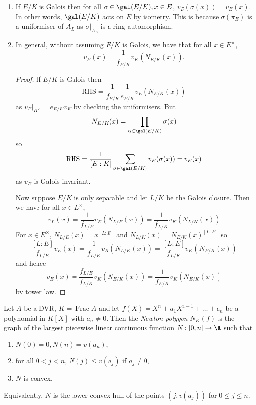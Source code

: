 \documentclass[a4paper]{article}
\DeclareMathOperator{\Frac}{Frac}
\begin{document}
\begin{remark}\leavevmode
  \begin{enumerate}
  \item If \(E/K\) is Galois then for all \(\sigma \in \gal(E/K), x \in E\), \(v_E(\sigma(x)) = v_E(x)\). In other words, \(\gal(E/K)\) acts on \(E\) by isometry. This is because \(\sigma(\pi_E)\) is a uniformiser of \(A_E\) as \(\sigma|_{A_E}\) is a ring automorphism.
  \item In general, without assuming \(E/K\) is Galois, we have that for all \(x \in E^\times\),
    \[
      v_E(x) = \frac{1}{f_{E/K}} v_K(N_{E/K}(x)).
    \]

    \begin{proof}
      If \(E/K\) is Galois then
      \[
        \mathrm{RHS } = \frac{1}{f_{E/K}} \frac{1}{e_{E/K}} v_E(N_{E/K}(x))
      \]
      as \(v_E|_{K^\times} = e_{E/K} v_K\) by checking the uniformisers. But
      \[
        N_{E/K}(x) = \prod_{\alpha \in \gal(E/K)} \sigma(x)
      \]
      so
      \[
        \mathrm{RHS} = \frac{1}{[E : K]} \sum_{\sigma \in \gal(E/K)} v_E(\sigma(x)) = v_E(x)
      \]
      as \(v_E\) is Galois invariant.

      Now suppose \(E/K\) is only separable and let \(L/K\) be the Galois closure. Then we have for all \(x \in L^\times\),
      \[
        v_L(x) = \frac{1}{f_{L/E}} v_E(N_{L/E}(x)) = \frac{1}{f_{L/K}} v_K(N_{L/K}(x))
      \]
      For \(x \in E^\times\), \(N_{L/E}(x) = x^{[L: E]}\) and \(N_{L/K}(x) = N_{E/K}(x)^{[L :E]}\) so
      \[
        \frac{[L: E]}{f_{L/E}} v_E(x) = \frac{1}{f_{L/K}} v_K(N_{L/K}(x)) = \frac{[L : E]}{f_{L/K}} v_K(N_{E/K}(x))
      \]
      and hence
      \[
        v_E(x) = \frac{f_{L/E}}{f_{L/K}} v_K(N_{E/K}(x)) = \frac{1}{f_{E/K}} v_K(N_{E/K}(x))
      \]
      by tower law.
    \end{proof}
  \end{enumerate}
\end{remark}

\begin{definition}
  Let \(A\) be a DVR, \(K = \Frac A\) and let \(f(X) = X^n + a_1X^{n - 1} + \dots + a_n\) be a polynomial in \(K[X]\) with \(a_n \neq 0\). Then the \emph{Newton polygon} \(N_K(f)\) is the graph of the largest piecewise linear continuous function \(N: [0, n] \to \R\) such that
  \begin{enumerate}
  \item \(N(0) = 0, N(n) = v(a_n)\),
  \item for all \(0 < j < n\), \(N(j) \leq v(a_j)\) if \(a_j \neq 0\),
  \item \(N\) is convex.
  \end{enumerate}
  Equivalently, \(N\) is the lower convex hull of the points \((j, v(a_j))\) for \(0 \leq j \leq n\).
\end{definition}
\end{document}
